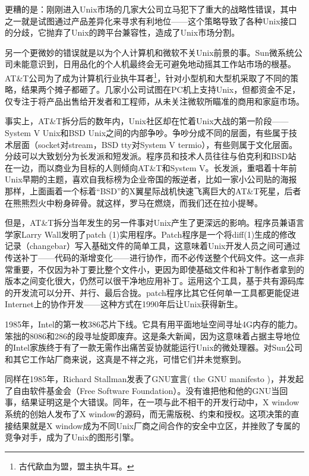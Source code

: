 \documentclass[12pt,oneside]{book}
\begin{document}
\begin{common-format}
更糟的是：刚刚进入Unix市场的几家大公司立马犯下了重大的战略性错误，其中之一就是试图通过产品差异化来寻求有利地位——这个策略导致了各种Unix接口的分歧，它抛弃了Unix的跨平台兼容性，造成了Unix市场分割。

另一个更微妙的错误就是以为个人计算机和微软不关Unix前景的事。Sun微系统公司未能意识到，日用品化的个人机最终会无可避免地动摇其工作站市场的根基。AT\&{}T公司为了成为计算机行业执牛耳者\footnote{古代歃血为盟，盟主执牛耳。}，针对小型机和大型机采取了不同的策略，结果两个摊子都砸了。几家小公司试图在PC机上支持Unix，但都资金不足，仅专注于将产品出售给开发者和工程师，从未关注微软所瞄准的商用和家庭市场。

事实上，AT\&{}T拆分后的数年内，Unix社区却在忙着Unix大战的第一阶段——System V Unix和BSD Unix之间的内部争吵。争吵分成不同的层面，有些属于技术层面（socket对stream，BSD tty对System V termio），有些则属于文化层面。分歧可以大致划分为长发派和短发派。程序员和技术人员往往与伯克利和BSD站在一边，而以商业为目标的人则倾向AT\&{}T和System V。长发派，重唱着十年前Unix早期的主题，喜欢自我标榜为企业帝国的叛逆者，比如一家小公司贴的海报那样，上面画着一个标着“BSD”的X翼星际战机快速飞离巨大的AT\&{}T死星，后者在熊熊烈火中粉身碎骨。就这样，罗马在燃烧，而我们还在拉小提琴。

但是，AT\&{}T拆分当年发生的另一件事对Unix产生了更深远的影响。程序员兼语言学家Larry Wall发明了patch (1)实用程序。Patch程序是一个将diff(1)生成的修改记录（changebar）写入基础文件的简单工具，这意味着Unix开发人员之间可通过传送补丁——代码的渐增变化——进行协作，而不必传送整个代码文件。这一点非常重要，不仅因为补丁要比整个文件小，更因为即使基础文件和补丁制作者拿到的版本之间变化很大，仍然可以很干净地应用补丁。运用这个工具，基于共有源码库的开发流可以分开、并行、最后合拢。patch程序比其它任何单一工具都更能促进Internet上的协作开发——这种方式在1990年后让Unix获得新生。

1985年，Intel的第一枚386芯片下线。它具有用平面地址空间寻址4G内存的能力。笨拙的8086和286的段寻址旋即废弃。这是条大新闻，因为这意味着占据主导地位的Intel家族终于有了一款无需作出痛苦妥协就能运行Unix的微处理器。对Sun公司和其它工作站厂商来说，这真是不祥之兆，可惜它们并未觉察到。

同样在1985年，Richard Stallman发表了GNU宣言( the GNU manifesto )\cite{Stallman}，并发起了自由软件基金会（Free Software Foundation）。没有谁把他和他的GNU当回事，结果证明这是个大错误。同年，在一项与此不相干的开发行动中，X window系统的创始人发布了X window的源码，而无需版税、约束和授权。这项决策的直接结果就是X window成为不同Unix厂商之间合作的安全中立区，并挫败了专属的竞争对手，成为了Unix的图形引擎。


\end{common-format}
\end{document}
